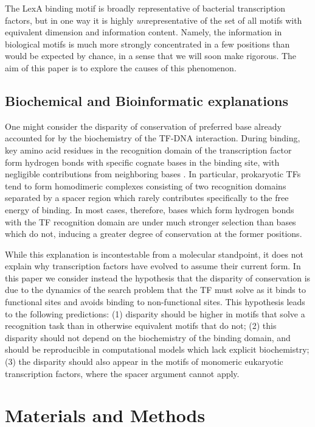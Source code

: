 \documentclass{article}
\begin{document}
The LexA binding motif is broadly representative of bacterial
transcription factors, but in one way it is highly
\textit{un}representative of the set of all motifs with equivalent
dimension and information content. Namely, the information in
biological motifs is much more strongly concentrated in a few
positions than would be expected by chance, in a sense that we will
soon make rigorous.  The aim of this paper is to explore the causes of
this phenomenon.


\subsection{Biochemical and Bioinformatic explanations}
One might consider the disparity of conservation of preferred base
already accounted for by the biochemistry of the TF-DNA interaction.
During binding, key amino acid residues in the recognition domain of
the transcription factor form hydrogen bonds with specific cognate
bases in the binding site, with negligible contributions from
neighboring bases \cite{ebright84}. In particular, prokaryotic TFs
tend to form homodimeric complexes consisting of two recognition
domains separated by a spacer region which rarely contributes
specifically to the free energy of binding.  In most cases, therefore,
bases which form hydrogen bonds with the TF recognition domain are
under much stronger selection than bases which do not, inducing a
greater degree of conservation at the former positions.

While this explanation is incontestable from a molecular standpoint, it
does not explain why transcription factors have evolved to assume
their current form.  In this paper we consider instead the hypothesis
that the disparity of conservation is due to the dynamics of the
search problem that the TF must solve as it binds to functional sites
and avoids binding to non-functional sites.  This hypothesis leads to
the following predictions: (1) disparity should be higher in motifs
that solve a recognition task than in otherwise equivalent motifs that
do not; (2) this disparity should not depend on the biochemistry of
the binding domain, and should be reproducible in computational models
which lack explicit biochemistry; (3) the disparity should also appear
in the motifs of monomeric eukaryotic transcription factors, where the
spacer argument cannot apply.

\section{Materials and Methods}
\end{document}
